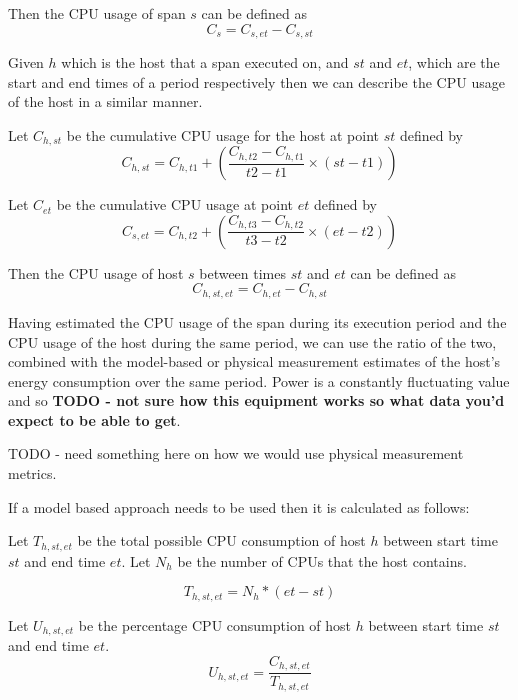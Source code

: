 Then the CPU usage of span $s$ can be defined as
\begin{equation}
C_{s} = C_{s,et} - C_{s,st}
\end{equation}

Given $h$ which is the host that a span executed on, and $st$ and $et$, which are the start and end times of a period respectively then we can describe the CPU usage of the host in a similar manner.

Let $C_{h, st}$ be the cumulative CPU usage for the host at point $st$ defined by
\begin{equation}
C_{h,st} = C_{h,t1} + ( \frac{C_{h,t2} - C_{h,t1}}{t2 - t1} \times (st - t1) ) 
\end{equation}

Let $C_{et}$ be the cumulative CPU usage at point $et$ defined by
\begin{equation}
C_{s,et} = C_{h,t2} + ( \frac{C_{h,t3} - C_{h,t2}}{t3 - t2} \times (et - t2) ) 
\end{equation}

Then the CPU usage of host $s$ between times $st$ and $et$ can be defined as
\begin{equation}
C_{h,st,et} = C_{h,et} - C_{h,st}
\end{equation}

Having estimated the CPU usage of the span during its execution period and the CPU usage of the host during the same period, we can use the ratio of the two, combined with the model-based or physical measurement estimates of the host's energy consumption over the same period.  Power is a constantly fluctuating value and so \textbf{TODO - not sure how this equipment works so what data you'd expect to be able to get}.

TODO - need something here on how we would use physical measurement metrics.


If a model based approach needs to be used then it is calculated as follows:

Let $T_{h,st,et}$ be the total possible CPU consumption of host $h$ between start time $st$ and end time $et$.  Let $N_{h}$ be the number of CPUs that the host contains.

\begin{equation}
T_{h,st,et} = N_{h} * (et - st)
\end{equation}

Let $U_{h,st,et}$ be the percentage CPU consumption of host $h$ between start time $st$ and end time $et$.
\begin{equation}
U_{h,st,et} = \frac{C_{h,st,et}}{T_{h,st,et}}
\end{equation}

